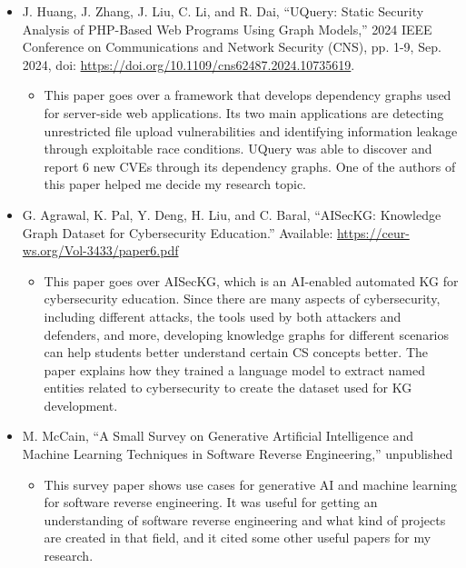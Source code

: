 \documentclass[12pt, a4paper]{article}
\begin{document}
    \begin{itemize}
        \item J. Huang, J. Zhang, J. Liu, C. Li, and R. Dai, “UQuery: Static Security Analysis of PHP-Based Web Programs Using Graph Models,” 
        2024 IEEE Conference on Communications and Network Security (CNS), pp. 1-9, Sep. 2024, doi: \url{https://doi.org/10.1109/cns62487.2024.10735619}. 
        \begin{itemize}
            \item This paper goes over a framework that develops dependency graphs used for server-side web applications. 
            Its two main applications are detecting unrestricted file upload vulnerabilities and identifying information leakage through exploitable race conditions. 
            UQuery was able to discover and report 6 new CVEs through its dependency graphs. One of the authors of this paper helped me decide my research topic.
        \end{itemize}
    \end{itemize}
    \begin{itemize}
        \item G. Agrawal, K. Pal, Y. Deng, H. Liu, and C. Baral, “AISecKG: Knowledge Graph Dataset for Cybersecurity Education.” 
        Available: \url{https://ceur-ws.org/Vol-3433/paper6.pdf} 
        \begin{itemize}
            \item This paper goes over AISecKG, which is an AI-enabled automated KG for cybersecurity education. 
            Since there are many aspects of cybersecurity, including different attacks, the tools used by both attackers and defenders, and more, 
            developing knowledge graphs for different scenarios can help students better understand certain CS concepts better. 
            The paper explains how they trained a language model to extract named entities related to cybersecurity to create the dataset used for KG development.
        \end{itemize}
    \end{itemize}
    \begin{itemize}
        \item M. McCain, “A Small Survey on Generative Artificial Intelligence and Machine Learning Techniques in Software Reverse Engineering,” unpublished
        \begin{itemize}
            \item This survey paper shows use cases for generative AI and machine learning for software reverse engineering. 
            It was useful for getting an understanding of software reverse engineering and what kind of projects are created in that field, 
            and it cited some other useful papers for my research. 
        \end{itemize}
    \end{itemize}
\end{document}
